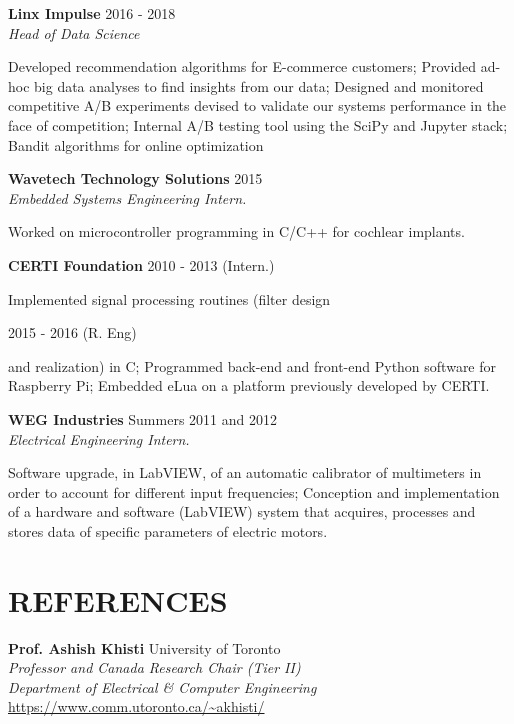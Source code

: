 \documentclass[margin, line]{res}
\begin{document}
\begin{resume}
\textbf{Linx Impulse} \hfill 2016 - 2018\\
{\sl Head of Data Science}\\
\begin{small}
    Developed recommendation algorithms for E-commerce customers; Provided ad-hoc big data analyses to find insights from our data; Designed and monitored competitive A/B experiments devised to validate our systems performance in the face of competition; Internal A/B testing tool using the SciPy and Jupyter stack; Bandit algorithms for online optimization
\end{small}

\textbf{Wavetech Technology Solutions} \hfill 2015\\
{\sl Embedded Systems Engineering Intern.}\\
\begin{small}
    Worked on microcontroller programming in C/C++ for cochlear implants.
\end{small}

\newpage
\textbf{CERTI Foundation} \hfill 2010 - 2013 (Intern.)\\
\begin{small}
    Implemented signal processing routines (filter design 
\end{small}
\hfill 2015 - 2016 (R. Eng)\\ 
\begin{small}
    and realization) in C; Programmed back-end and front-end Python software for Raspberry Pi; Embedded eLua on a platform previously developed by CERTI.
\end{small}

\textbf{WEG Industries}  \hfill Summers 2011 and 2012\\
{\sl Electrical Engineering Intern.}\\
\begin{small}
    Software upgrade, in LabVIEW, of an automatic calibrator of multimeters in order to account for different input frequencies; Conception and implementation of a hardware and software (LabVIEW) system that acquires, processes and stores data of specific parameters of electric motors.
\end{small}

\section{REFERENCES}
\textbf{Prof. Ashish Khisti} \hfill University of Toronto\\
{\sl Professor and Canada Research Chair (Tier II)}\\
{\sl Department of Electrical \& Computer Engineering}\\
\url{https://www.comm.utoronto.ca/~akhisti/}


\end{resume}
\end{document}
